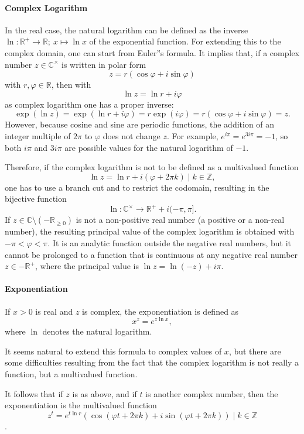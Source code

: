 \paragraph{Complex Logarithm}

In the real case, the natural logarithm can be defined as the inverse $\ln: \mathbb{R}^+ \to \mathbb{R};\ x \mapsto \ln x$ of the exponential function. For extending this to the complex domain, one can start from Euler''s formula. It implies that, if a complex number $z \in \mathbb{C}^\times$ is written in polar form
$$
z = r (\cos \varphi + i \sin \varphi)
$$
with $r, \varphi \in \mathbb{R}$, then with
$$
\ln z = \ln r + i \varphi
$$
as complex logarithm one has a proper inverse:
$$
\exp (\ln z) = \exp (\ln r + i \varphi) = r \exp (i \varphi) = r (\cos \varphi + i \sin \varphi) = z.
$$
However, because cosine and sine are periodic functions, the addition of an integer multiple of $2\pi$ to $\varphi$ does not change $z$. For example, $e^{i\pi} = e^{3i\pi} = -1$, so both $i\pi$ and $3i\pi$ are possible values for the natural logarithm of $-1$.

Therefore, if the complex logarithm is not to be defined as a multivalued function
$$
\ln z = \ln r + i (\varphi + 2\pi k) \mid k \in \mathbb{Z},
$$
one has to use a branch cut and to restrict the codomain, resulting in the bijective function
$$
\ln \colon \mathbb{C}^\times \to \mathbb{R}^+ + i (-\pi, \pi].
$$
If $z \in \mathbb{C} \setminus (-\mathbb{R}_{\geq 0})$ is not a non-positive real number (a positive or a non-real number), the resulting principal value of the complex logarithm is obtained with $-\pi < \varphi < \pi$. It is an analytic function outside the negative real numbers, but it cannot be prolonged to a function that is continuous at any negative real number $z \in -\mathbb{R}^+$, where the principal value is $\ln z = \ln(-z) + i\pi$.

\paragraph{Exponentiation}

If $x > 0$ is real and $z$ is complex, the exponentiation is defined as
$$
x^z = e^{z \ln x},
$$
where $\ln$ denotes the natural logarithm. 

It seems natural to extend this formula to complex values of $x$, but there are some difficulties resulting from the fact that the complex logarithm is not really a function, but a multivalued function.

It follows that if $z$ is as above, and if $t$ is another complex number, then the exponentiation is the multivalued function
$$
z^t =  e^{t \ln r}(\cos(\varphi t + 2\pi k) + i \sin(\varphi t + 2\pi k)) \mid k \in \mathbb{Z}$$.

